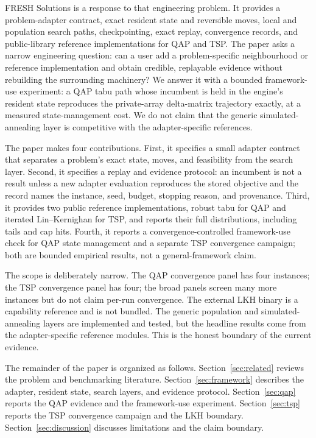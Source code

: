 \documentclass[11pt]{article}
\begin{document}
FRESH Solutions is a response to that engineering problem. It provides a problem-adapter contract,
exact resident state and reversible moves, local and population search paths, checkpointing, exact
replay, convergence records, and public-library reference implementations for QAP and TSP. The paper
asks a narrow engineering question: can a user add a problem-specific neighbourhood or reference
implementation and obtain credible, replayable evidence without rebuilding the surrounding machinery?
We answer it with a bounded framework-use experiment: a QAP tabu path whose incumbent is held in the
engine's resident state reproduces the private-array delta-matrix trajectory exactly, at a measured
state-management cost. We do not claim that the generic simulated-annealing layer is competitive with
the adapter-specific references.

The paper makes four contributions. First, it specifies a small adapter contract that separates a
problem's exact state, moves, and feasibility from the search layer. Second, it specifies a replay and
evidence protocol: an incumbent is not a result unless a new adapter evaluation reproduces the
stored objective and the record names the instance, seed, budget, stopping reason, and provenance.
Third, it provides two public reference implementations, robust tabu for QAP and iterated
Lin--Kernighan for TSP, and reports their full distributions, including tails and cap hits. Fourth, it
reports a convergence-controlled framework-use check for QAP state management and a separate TSP
convergence campaign; both are bounded empirical results, not a general-framework claim.

The scope is deliberately narrow. The QAP convergence panel has four instances; the TSP convergence
panel has four; the broad panels screen many more instances but do not claim per-run convergence. The
external LKH binary is a capability reference and is not bundled. The generic population and
simulated-annealing layers are implemented and tested, but the headline results come from the
adapter-specific reference modules. This is the honest boundary of the current evidence.

The remainder of the paper is organized as follows. Section~\ref{sec:related} reviews the problem and
benchmarking literature. Section~\ref{sec:framework} describes the adapter, resident state, search
layers, and evidence protocol. Section~\ref{sec:qap} reports the QAP evidence and the framework-use
experiment. Section~\ref{sec:tsp} reports the TSP convergence campaign and the LKH boundary.
Section~\ref{sec:discussion} discusses
limitations and the claim boundary.
\end{document}
